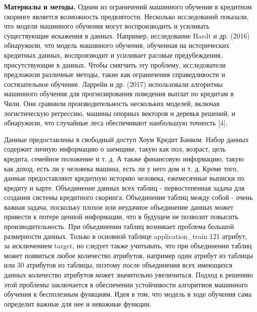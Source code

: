 \begin{multicols}{2}
{\bfseries Материалы и методы.} Одним из ограничений машинного обучения в
кредитном скоринге является возможность предвзятости. Несколько
исследований показали, что модели машинного обучения могут
воспроизводить и усиливать существующие искажения в данных. Например,
исследование Hardt и др. (2016) обнаружили, что модель машинного
обучения, обученная на исторических кредитных данных, воспроизводит и
усиливает расовые предубеждения, присутствующие в данных. Чтобы смягчить
эту проблему, исследователи предложили различные методы, такие как
ограничения справедливости и состязательное обучение. Ларрейн и др.
(2017) использовали алгоритмы машинного обучения для прогнозирования
поведения выплат по кредитам в Чили. Они сравнили производительность
нескольких моделей, включая логистическую регрессию, машины опорных
векторов и деревья решений, и обнаружили, что случайные леса
обеспечивают наибольшую точность {[}4{]}.

Данные предоставлены в свободный доступ Хоум Кредит Банком. Набор данных
содержит личную информацию о заемщике, такую \hspace{0pt}\hspace{0pt}как
пол, возраст, цель кредита, семейное положение и т. д. А также
финансовую информацию, такую
\hspace{0pt}\hspace{0pt}\hspace{0pt}\hspace{0pt}как доход, есть ли у
человека машина, есть ли у него дом и т. д. Кроме того, данные
предоставляют кредитную историю человека, ежемесячные выписки по кредиту
и карте. Объединение данных всех таблиц - первостепенная задача для
создания системы кредитного скоринга. Объединение таблиц между собой -
очень важная задача, поскольку плохое или неудачное объединение данных
может привести к потере ценной информации, что в будущем не позволит
повысить производительность. При объединении таблиц возникает проблема
большой размерности данных. Только в основной таблице application\_train
121 атрибут, за исключением target, но следует также учитывать, что при
объединении таблиц может появиться любое количество атрибутов, например
один атрибут из таблицы или 30 атрибутов из таблицы, поэтому после
объединения всех имеющихся данных количество атрибутов может значительно
увеличиться. Подход к решению этой проблемы заключается в обеспечении
устойчивости алгоритмов машинного обучения к бесполезным функциям. Идея
в том, что модель в ходе обучения сама определит важные для нее и
неважные функции.


\end{multicols}
